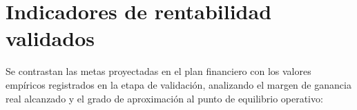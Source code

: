 \section{Indicadores de rentabilidad validados}
\label{sec:indicadores_validados}

Se contrastan las metas proyectadas en el plan financiero con los valores empíricos registrados en la etapa de validación, analizando el margen de ganancia real alcanzado y el grado de aproximación al punto de equilibrio operativo:



